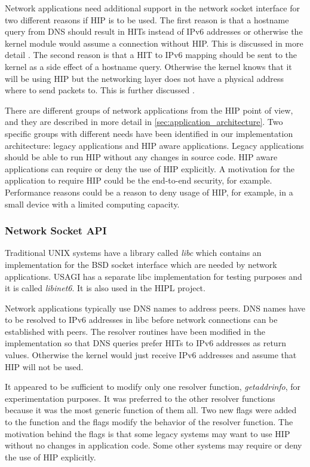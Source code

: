 Network applications need additional support in the network socket
interface for two different reasons if HIP is to be used. The first
reason is that a hostname query from DNS should result in HITs instead
of IPv6 addresses or otherwise the kernel module would assume a
connection without HIP. This is discussed in more detail
. The second reason is that a HIT
to
IPv6 mapping should be sent to the kernel as a side effect of a
hostname query. Otherwise the kernel knows that it will be using HIP
but the networking layer does not have a physical address where to
send packets to. This is further discussed
.

There are different groups of network applications from the HIP point
of view, and they are described in more detail in
\autoref{sec:application_architecture}. Two specific groups with
different needs have been identified in our implementation
architecture: legacy applications and HIP aware applications. Legacy
applications should be able to run HIP without any changes in source
code. HIP aware applications can require or deny the use of HIP
explicitly. A motivation for the application to require HIP could be
the end-to-end security, for example. Performance reasons could be a
reason to deny usage of HIP, for example, in a small device with a
limited computing capacity.

\subsubsection{Network Socket API}
\label{sec:api_architecture}

Traditional UNIX systems have a library called \textit{libc} which
contains an implementation for the BSD socket interface \cite{stevens}
which are needed by network applications. USAGI has a separate libc
implementation for testing purposes and it is called
\textit{libinet6}. It is also used in the HIPL project.

Network applications typically use DNS names to address peers. DNS
names have to be resolved to IPv6 addresses in libc before network
connections can be established with peers. The resolver routines have
been modified in the implementation so that DNS queries prefer HITs to
IPv6 addresses as return values. Otherwise the kernel would just
receive IPv6 addresses and assume that HIP will not be used.

It appeared to be sufficient to modify only one resolver function,
\textit{getaddrinfo}, for experimentation purposes. It was preferred
to the other resolver functions because it was the most generic
function of them all. Two new flags were added to the function and the
flags modify the behavior of the resolver function. The motivation
behind the flags is that some legacy systems may want to use HIP
without no changes in application code. Some other systems may require
or deny the use of HIP explicitly.


